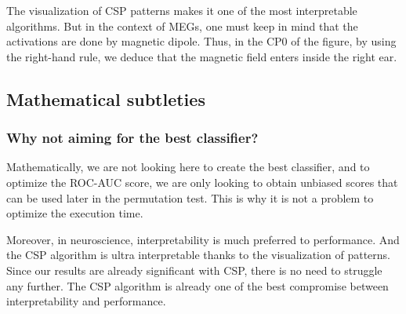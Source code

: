 The visualization of CSP patterns makes it one of the most interpretable algorithms. But in the context of MEGs, one must keep in mind that the activations are done by magnetic dipole. Thus, in the CP0 of the figure, by using the right-hand rule, we deduce that the magnetic field enters inside the right ear.

\subsection{Mathematical subtleties}

\subsubsection{Why not aiming for the best classifier?}
Mathematically, we are not looking here to create the best classifier, and to optimize the ROC-AUC score, we are only looking to obtain unbiased scores that can be used later in the permutation test. This is why it is not a problem to optimize the execution time.

Moreover, in neuroscience, interpretability is much preferred to performance. And the CSP algorithm is ultra interpretable thanks to the visualization of patterns. Since our results are already significant with CSP, there is no need to struggle any further. The CSP algorithm is already one of the best compromise between interpretability and performance.





